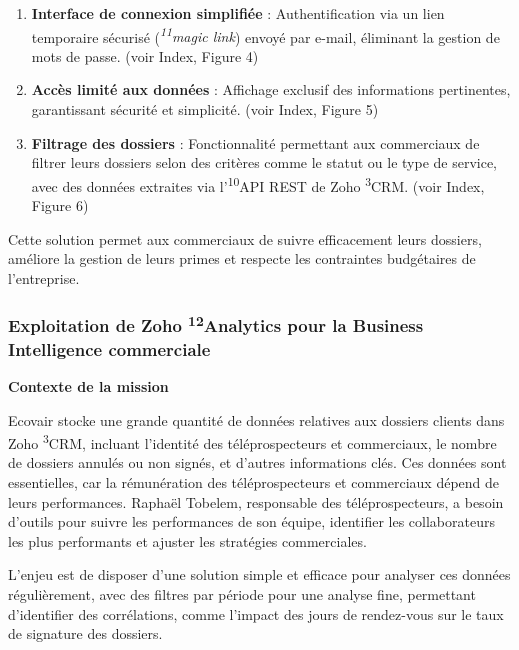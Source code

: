 \begin{enumerate}
    \item \textbf{Interface de connexion simplifiée} : Authentification via un lien temporaire sécurisé (\textit{\textsuperscript{11}magic link}) envoyé par e-mail, éliminant la gestion de mots de passe. (voir Index, Figure 4)\vspace{0.3cm}
    \item \textbf{Accès limité aux données} : Affichage exclusif des informations pertinentes, garantissant sécurité et simplicité. (voir Index, Figure 5)\vspace{0.3cm}
    \item \textbf{Filtrage des dossiers} : Fonctionnalité permettant aux commerciaux de filtrer leurs dossiers selon des critères comme le statut ou le type de service, avec des données extraites via l’\textsuperscript{10}API REST de Zoho \textsuperscript{3}CRM. (voir Index, Figure 6)\vspace{0.3cm}
\end{enumerate}

Cette solution permet aux commerciaux de suivre efficacement leurs dossiers, améliore la gestion de leurs primes et respecte les contraintes budgétaires de l’entreprise.


\subsubsection{Exploitation de Zoho \textsuperscript{12}Analytics pour la Business Intelligence commerciale}

\textbf{Contexte de la mission}\vspace{0.3cm}

Ecovair stocke une grande quantité de données relatives aux dossiers clients dans Zoho \textsuperscript{3}CRM, incluant l’identité des téléprospecteurs et commerciaux, le nombre de dossiers annulés ou non signés, et d’autres informations clés. Ces données sont essentielles, car la rémunération des téléprospecteurs et commerciaux dépend de leurs performances. Raphaël Tobelem, responsable des téléprospecteurs, a besoin d’outils pour suivre les performances de son équipe, identifier les collaborateurs les plus performants et ajuster les stratégies commerciales.

L’enjeu est de disposer d’une solution simple et efficace pour analyser ces données régulièrement, avec des filtres par période pour une analyse fine, permettant d’identifier des corrélations, comme l’impact des jours de rendez-vous sur le taux de signature des dossiers.\vspace{0.3cm}

